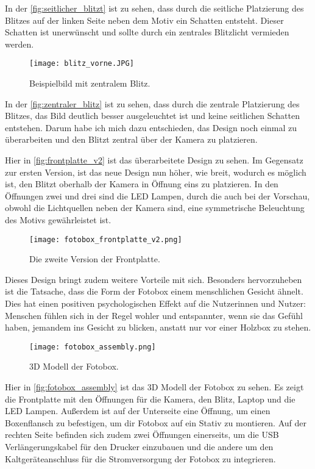 In der \autoref{fig:seitlicher_blitzt} ist zu sehen, dass durch die seitliche Platzierung des Blitzes 
auf der linken Seite neben dem Motiv ein Schatten entsteht. Dieser Schatten ist unerwünscht und sollte
durch ein zentrales Blitzlicht vermieden werden.

\begin{figure}[H]
    \centering
    \texttt{[image: blitz\_vorne.JPG]}
    \caption{Beispielbild mit zentralem Blitz.}
    \label{fig:zentraler_blitz}
\end{figure}

In der \autoref{fig:zentraler_blitz} ist zu sehen, dass durch die zentrale Platzierung des Blitzes,
das Bild deutlich besser ausgeleuchtet ist und keine seitlichen Schatten entstehen.
Darum habe ich mich dazu entschieden, das Design noch einmal zu überarbeiten und
den Blitzt zentral über der Kamera zu platzieren.

\newpage

Hier in \autoref{fig:frontplatte_v2} ist das überarbeitete Design zu sehen.
Im Gegensatz zur ersten Version, ist das neue Design 
nun höher, wie breit, wodurch es möglich ist, den Blitzt oberhalb der Kamera in 
Öffnung eins zu platzieren. In den Öffnungen zwei und drei sind die LED Lampen,
durch die auch bei der Vorschau, obwohl die Lichtquellen neben der Kamera sind,
eine symmetrische Beleuchtung des Motivs gewährleistet ist.

\begin{figure}[H]
    \centering
    \texttt{[image: fotobox\_frontplatte\_v2.png]}
    \caption{Die zweite Version der Frontplatte.}
    \label{fig:frontplatte_v2}
\end{figure}

Dieses Design bringt zudem weitere Vorteile mit sich. Besonders hervorzuheben
ist die Tatsache, dass die Form der Fotobox einem menschlichen Gesicht ähnelt.
Dies hat einen positiven psychologischen Effekt auf die Nutzerinnen und Nutzer:
Menschen fühlen sich in der Regel wohler und entspannter, wenn sie das Gefühl
haben, jemandem ins Gesicht zu blicken, anstatt nur vor einer Holzbox zu stehen.


\newpage

\begin{figure}[H]
    \centering
    \texttt{[image: fotobox\_assembly.png]}
    \caption{3D Modell der Fotobox.}
    \label{fig:fotobox_assembly}
\end{figure}

Hier in \autoref{fig:fotobox_assembly} ist das 3D Modell der Fotobox zu sehen.
Es zeigt die Frontplatte mit den Öffnungen für die Kamera, den Blitz, Laptop
und die LED Lampen. Außerdem ist auf der Unterseite eine Öffnung, um 
einen Boxenflansch zu befestigen, um dir Fotobox auf ein Stativ zu montieren.
Auf der rechten Seite befinden sich zudem zwei Öffnungen einerseits, um die
USB Verlängerungskabel für den Drucker einzubauen und die andere um den Kaltgeräteanschluss
für die Stromversorgung der Fotobox zu integrieren.


